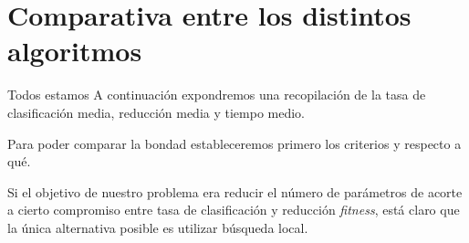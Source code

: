 
\section{Comparativa entre los distintos algoritmos}

Todos estamos 
A continuación expondremos una recopilación de la tasa de clasificación media, reducción media  y tiempo medio.


\begin{table}[h]
    \centering
    \caption{Comparativas tasa de clasificación media, reducción media  y tiempo medio distintos algoritmos.}
    \label{Tabla:comparativas final}
      
\end{table}

Para poder comparar la bondad estableceremos primero los criterios 
y respecto a qué. 

Si el objetivo de nuestro problema era reducir el número de parámetros de acorte
a cierto compromiso entre tasa de clasificación y reducción \textit{fitness}, está claro 
que la única alternativa posible es utilizar búsqueda local.

